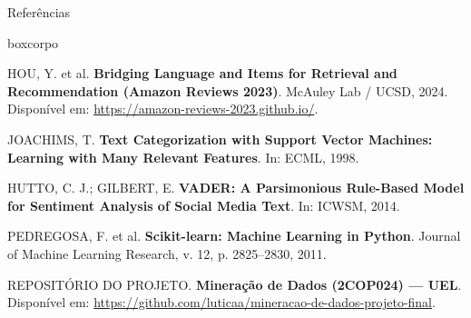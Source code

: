 \documentclass[aspectratio=43]{beamer}
\begin{document}
\begin{frame}[t]{Referências}

\vspace{0.3cm}

\scriptsize
\begin{beamercolorbox}[wd=0.96\textwidth, sep=0.25cm]{boxcorpo}

HOU, Y. et al. \textbf{Bridging Language and Items for Retrieval and Recommendation (Amazon Reviews 2023)}. McAuley Lab / UCSD, 2024. Disponível em: \url{https://amazon-reviews-2023.github.io/}.

\vspace{0.22cm}

JOACHIMS, T. \textbf{Text Categorization with Support Vector Machines: Learning with Many Relevant Features}. In: ECML, 1998.

\vspace{0.22cm}

HUTTO, C. J.; GILBERT, E. \textbf{VADER: A Parsimonious Rule-Based Model for Sentiment Analysis of Social Media Text}. In: ICWSM, 2014.

\vspace{0.22cm}

PEDREGOSA, F. et al. \textbf{Scikit-learn: Machine Learning in Python}. Journal of Machine Learning Research, v. 12, p. 2825--2830, 2011.

\vspace{0.22cm}

REPOSITÓRIO DO PROJETO. \textbf{Mineração de Dados (2COP024) --- UEL}. Disponível em: \url{https://github.com/luticaa/mineracao-de-dados-projeto-final}.

\end{beamercolorbox}

\end{frame}
\end{document}
